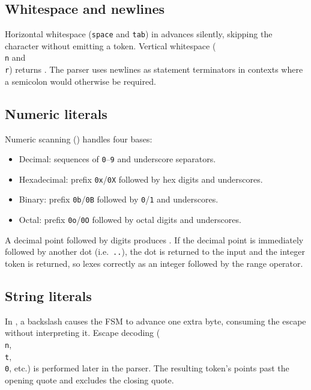 \subsection{Whitespace and newlines}
\label{sec:lex-whitespace}

\pnum
Horizontal whitespace (\texttt{space} and \texttt{tab}) in 
advances  silently, skipping the character without emitting a
token.  Vertical whitespace (\texttt{\\n} and \texttt{\\r}) returns
.  The parser uses newlines as statement terminators in
contexts where a semicolon would otherwise be required.

\subsection{Numeric literals}
\label{sec:lex-numbers}

\pnum
Numeric scanning () handles four bases:
\begin{itemize}
\item Decimal: sequences of \texttt{0}--\texttt{9} and underscore separators.
\item Hexadecimal: prefix \texttt{0x}/\texttt{0X} followed by hex digits and underscores.
\item Binary: prefix \texttt{0b}/\texttt{0B} followed by \texttt{0}/\texttt{1} and underscores.
\item Octal: prefix \texttt{0o}/\texttt{0O} followed by octal digits and underscores.
\end{itemize}

\pnum
A decimal point followed by digits produces .
If the decimal point is immediately followed by another dot (i.e.\ \texttt{..}),
the dot is returned to the input and the integer token is returned, so
 lexes correctly as an integer followed by the range operator.

\subsection{String literals}
\label{sec:lex-strings}

\pnum
In , a backslash causes the FSM to advance
 one extra byte, consuming the escape without interpreting it.
Escape decoding (\texttt{\\n}, \texttt{\\t}, \texttt{\\0}, etc.) is performed
later in the parser.  The resulting token's  points past the opening
quote and  excludes the closing quote.


